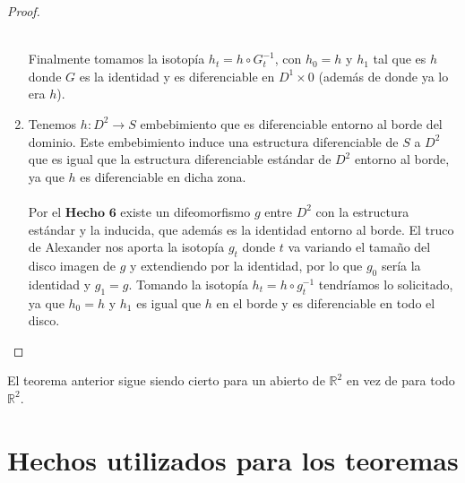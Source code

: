 \begin{proof}
\begin{enumerate}
				\\ Finalmente tomamos la isotopía $h_t = h \circ G_t^{-1}$, con $h_0 = h$ y $h_1$ tal que es $h$ donde $G$ es la identidad y es diferenciable en $D^1 \times 0$ (además de donde ya lo era $h$).
			\item Tenemos $h: D^2 \rightarrow S$ embebimiento que es diferenciable entorno al borde del dominio. Este embebimiento induce una estructura diferenciable de $S$ a $D^2$ que es igual que la estructura diferenciable estándar de $D^2$ entorno al borde, ya que $h$ es diferenciable en dicha zona.\\
				\\ Por el $\textbf{Hecho 6}$ existe un difeomorfismo $g$ entre $D^2$ con la estructura estándar y la inducida, que además es la identidad entorno al borde. El truco de Alexander nos aporta la isotopía $g_t$ donde $t$ va variando el tamaño del disco imagen de $g$ y extendiendo por la identidad, por lo que $g_0$ sería la identidad y $g_1 = g$. Tomando la isotopía $h_t = h \circ g_t^{-1}$ tendríamos lo solicitado, ya que $h_0 = h$ y $h_1$ es igual que $h$ en el borde y es diferenciable en todo el disco.
		\end{enumerate}
		
	\end{proof}
	\begin{corolario}
		El teorema anterior sigue siendo cierto para un abierto de $\mathbb{R}^2$ en vez de para todo $\mathbb{R}^2$.
	\end{corolario}


\section{Hechos utilizados para los teoremas}

\endinput
